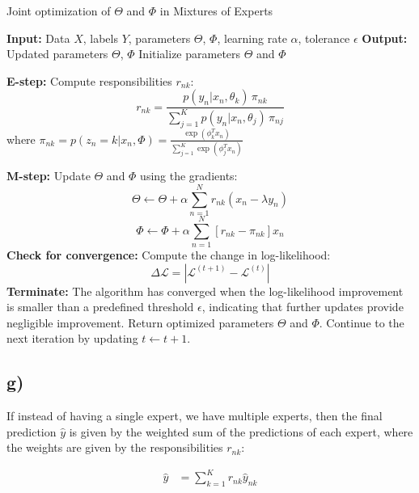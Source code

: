 \documentclass[12pt,a4paper,oneside]{paper}
\begin{document}
\begin{algorithm}
    \caption{Joint optimization of \( \Theta \) and \( \Phi \) in Mixtures of Experts}
    \begin{algorithmic}
        \State \textbf{Input:} Data \( X \), labels \( Y \), parameters \( \Theta \), \( \Phi \), learning rate \( \alpha \), tolerance \( \epsilon \)
        \State \textbf{Output:} Updated parameters \( \Theta \), \( \Phi \)
        \State Initialize parameters \( \Theta \) and \( \Phi \)
        
            \State \textbf{E-step:} Compute responsibilities \( r_{nk} \):
            \[
            r_{nk} = \frac{p(y_n | x_n, \theta_k) \, \pi_{nk}}{\sum_{j=1}^{K} p(y_n | x_n, \theta_j) \, \pi_{nj}}
            \]
            where \( \pi_{nk} = p(z_n = k | x_n, \Phi) = \frac{\exp(\phi_k^T x_n)}{\sum_{j=1}^{K} \exp(\phi_j^T x_n)} \)
            
            \State \textbf{M-step:} Update \( \Theta \) and \( \Phi \) using the gradients:
            \[
            \Theta \leftarrow \Theta + \alpha \sum_{n=1}^{N} r_{nk} \left( x_n - \lambda y_n \right)
            \]
            \[
            \Phi \leftarrow \Phi + \alpha \sum_{n=1}^{N} \left[ r_{nk} - \pi_{nk} \right] x_n
            \]
            \State \textbf{Check for convergence:} 
            \State \quad Compute the change in log-likelihood:
            \[
            \Delta \mathcal{L} = \left| \mathcal{L}^{(t+1)} - \mathcal{L}^{(t)} \right|
            \]
                \State \textbf{Terminate:} The algorithm has converged when the log-likelihood improvement is smaller than a predefined threshold \( \epsilon \), indicating that further updates provide negligible improvement.
                \State \quad Return optimized parameters \( \Theta \) and \( \Phi \).
            \Else
                \State \quad Continue to the next iteration by updating \( t \leftarrow t + 1 \).
            \EndIf
        \EndWhile
    \end{algorithmic}
\end{algorithm}


\newpage
\subsection*{g)}

If instead of having a single expert, we have multiple experts, then the final prediction $\hat{y}$ is given by
the weighted sum of the predictions of each expert, where the weights are given by the responsibilities $r_{nk}$:

\begin{align*}
    \hat{y} &= \sum_{k=1}^{K} r_{nk} \hat{y}_{nk} \\
\end{align*}



\clearpage

\appendix


\newpage
\printbibliography
\end{document}
